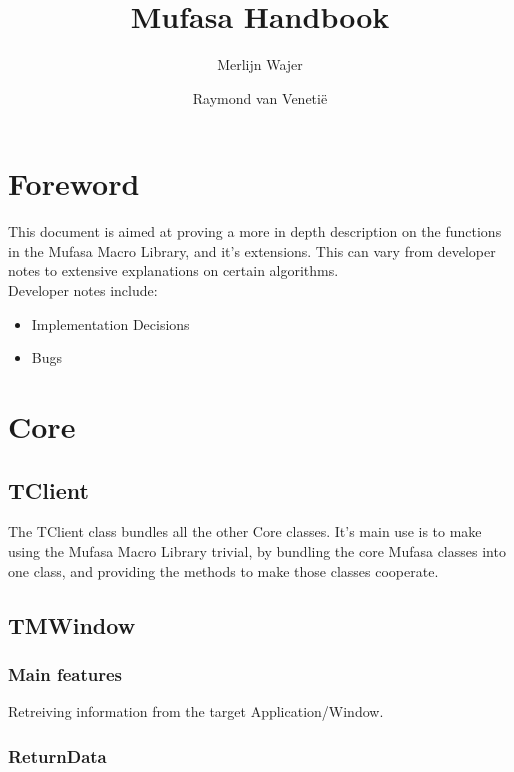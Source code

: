 \documentclass[a4paper]{report}
\begin{document}
\title{Mufasa Handbook}
\author{Merlijn Wajer \and Raymond van Veneti\"{e}}

\maketitle
\tableofcontents

\chapter{Foreword}

This document is aimed at proving a more in depth description on the
functions in the Mufasa Macro Library, and it's extensions.
This can vary from developer notes to extensive explanations on certain
algorithms. \\
Developer notes include:
\begin{itemize}
	\item Implementation Decisions
	\item Bugs
\end{itemize}

\chapter{Core}

\section{TClient}

The TClient class bundles all the other Core classes.
It's main use is to make using the Mufasa Macro Library trivial, by bundling
the core Mufasa classes into one class, and providing the methods to make those
classes cooperate.

\section{TMWindow}

\subsection{Main features}

Retreiving information from the target Application/Window.

\subsection{ReturnData}
\end{document}

